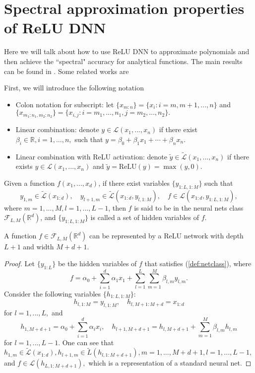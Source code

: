 \chapter{Spectral approximation properties of ReLU DNN}
Here we will talk about how to use ReLU DNN to approximate polynomials
and then achieve the ``spectral" accuracy for analytical functions.
The main results can be found in \cite{yarotsky2017error,
  wang2018exponential}. Some related works are
\cite{liang2016why,lu2017expressive}


First, we will introduce the following notation
\begin{itemize}
\item Colon notation for subscript: let $\{x_{m:n}\} = \{x_i:i =
  m,m+1,...,n\}$ and $\{x_{m_1:n_1,m_2:n_2}\}= \{x_{i,j}:i =
  m_1,...,n_1,j = m_2,...,n_2\}.$
\item Linear combination: denote $y\in \mathcal L(x_1,...,x_n)$ if
  there exist $\beta_i\in \mathbb{R},i=1,...,n,$ such that $y =
  \beta_0+\beta_1x_1+\cdots+\beta_n x_n$.
\item Linear combination with ReLU activation: denote $\tilde{y}\in
  \tilde{\mathcal L}(x_1,...,x_n)$ if there exists $y\in
  \mathcal{L}(x_1,...,x_n)$ and $\tilde{y} = \mbox{ReLU}(y) =
  \max(y,0).$
\end{itemize}
\begin{definition}
Given a function $f(x_1,...,x_d)$, if there exist variables $\{y_{1:L,1:M}\}$ such that 
\begin{equation}
y_{1,m}\in \tilde{\mathcal L}(x_{1:d}),\quad y_{l+1,m} \in \tilde{\mathcal L}(x_{1:d},y_{l,1:M}),\quad f\in\mathcal{L}(x_{1:d},y_{1:L,1:M}),
\end{equation}\label{def:netclass}
where $m=1,...,M,l=1,...,L-1$, then $f$ is said to be in the neural nets class $\mathcal{F}_{L,M}(\mathbb{R}^d)$, and $\{y_{1:L,1:M}\}$ is called a set of hidden variables of $f$. 
\end{definition}
\begin{properties}
A function $f\in \mathcal F_{L,M}(\mathbb R^d)$ can be represented by a ReLU network with depth $L+1$ and width $M+d+1$.
\end{properties}
\begin{proof}
Let $\{y_{1:L}\}$ be the hidden variables of $f$ that satisfies (\ref{def:netclass}), where
$$
f = \alpha_0 + \sum_{i=1}^d \alpha_1x_1+\sum_{l=1}^L\sum_{m=1}^M \beta_{l,m}y_{l,m}.
$$
Consider the following variables $\{h_{1:L,1:M}\}$:
$$
h_{l,1:M} = y_{l,1:M}, \quad h_{l,M+1:M+d} = x_{1:d}
$$
for $l = 1,...,L,$ and
$$
h_{1,M+d+1} = \alpha_0 + \sum_{i=1}^d\alpha_ix_i,\quad h_{l+1,M+d+1} =h_{l,M+d+1} + \sum_{m=1}^M\beta_{l,m}h_{l,m}
$$
for $l=1,...,L-1$. One can see that $h_{1,m}\in \tilde{\mathcal L}(x_{1:d}),h_{l+1,m}\in \tilde{L}(h_{l,1:M+d+1}),m = 1,...,M+d+1,l = 1,...,L-1,$ and $f\in \mathcal{L}(h_{L,1:M+d+1}),$ which is a representation of a standard neural net.
\end{proof}

